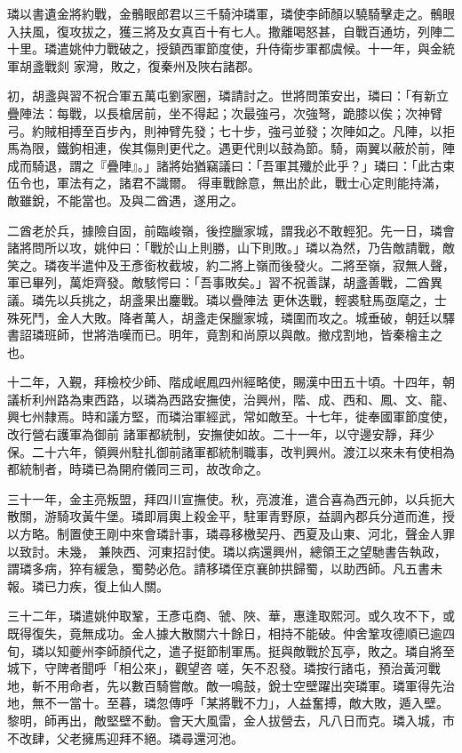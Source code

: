 \begin{pinyinscope}
 璘以書遺金將約戰，金鶻眼郎君以三千騎沖璘軍，璘使李師顏以驍騎擊走之。鶻眼入扶風，復攻拔之，獲三將及女真百十有七人。撒離喝怒甚，自戰百通坊，列陣二十里。璘遣姚仲力戰破之，授鎮西軍節度使，升侍衛步軍都虞候。十一年，與金統軍胡盞戰剡
 家灣，敗之，復秦州及陜右諸郡。



 初，胡盞與習不祝合軍五萬屯劉家圈，璘請討之。世將問策安出，璘曰：「有新立疊陣法：每戰，以長槍居前，坐不得起；次最強弓，次強弩，跪膝以俟；次神臂弓。約賊相搏至百步內，則神臂先發；七十步，強弓並發；次陣如之。凡陣，以拒馬為限，鐵鉤相連，俟其傷則更代之。遇更代則以鼓為節。騎，兩翼以蔽於前，陣成而騎退，謂之『疊陣』。」諸將始猶竊議曰：「吾軍其殲於此乎？」璘曰：「此古束伍令也，軍法有之，諸君不識爾。
 得車戰餘意，無出於此，戰士心定則能持滿，敵雖銳，不能當也。及與二酋遇，遂用之。



 二酋老於兵，據險自固，前臨峻嶺，後控臘家城，謂我必不敢輕犯。先一日，璘會諸將問所以攻，姚仲曰：「戰於山上則勝，山下則敗。」璘以為然，乃告敵請戰，敵笑之。璘夜半遣仲及王彥銜枚截坡，約二將上嶺而後發火。二將至嶺，寂無人聲，軍已畢列，萬炬齊發。敵駭愕曰：「吾事敗矣。」習不祝善謀，胡盞善戰，二酋異議。璘先以兵挑之，胡盞果出鏖戰。璘以疊陣法
 更休迭戰，輕裘駐馬亟麾之，士殊死鬥，金人大敗。降者萬人，胡盞走保臘家城，璘圍而攻之。城垂破，朝廷以驛書詔璘班師，世將浩嘆而已。明年，竟割和尚原以與敵。撤戍割地，皆秦檜主之也。



 十二年，入覲，拜檢校少師、階成岷鳳四州經略使，賜漢中田五十頃。十四年，朝議析利州路為東西路，以璘為西路安撫使，治興州，階、成、西和、鳳、文、龍、興七州隸焉。時和議方堅，而璘治軍經武，常如敵至。十七年，徙奉國軍節度使，改行營右護軍為御前
 諸軍都統制，安撫使如故。二十一年，以守邊安靜，拜少保。二十六年，領興州駐扎御前諸軍都統制職事，改判興州。渡江以來未有使相為都統制者，時璘已為開府儀同三司，故改命之。



 三十一年，金主亮叛盟，拜四川宣撫使。秋，亮渡淮，遣合喜為西元帥，以兵扼大散關，游騎攻黃牛堡。璘即肩輿上殺金平，駐軍青野原，益調內郡兵分道而進，授以方略。制置使王剛中來會璘計事，璘尋移檄契丹、西夏及山東、河北，聲金人罪以致討。未幾，
 兼陜西、河東招討使。璘以病還興州，總領王之望馳書告執政，謂璘多病，猝有緩急，蜀勢必危。請移璘侄京襄帥拱歸蜀，以助西師。凡五書未報。璘已力疾，復上仙人關。



 三十二年，璘遣姚仲取鞏，王彥屯商、虢、陜、華，惠逢取熙河。或久攻不下，或既得復失，竟無成功。金人據大散關六十餘日，相持不能破。仲舍鞏攻德順已逾四旬，璘以知夔州李師顏代之，遣子挺節制軍馬。挺與敵戰於瓦亭，敗之。璘自將至城下，守陴者聞呼「相公來」，觀望咨
 嗟，矢不忍發。璘按行諸屯，預治黃河戰地，斬不用命者，先以數百騎嘗敵。敵一鳴鼓，銳士空壁躍出突璘軍。璘軍得先治地，無不一當十。至暮，璘忽傳呼「某將戰不力」，人益奮搏，敵大敗，遁入壁。黎明，師再出，敵堅壁不動。會天大風雷，金人拔營去，凡八日而克。璘入城，市不改肆，父老擁馬迎拜不絕。璘尋還河池。




\end{pinyinscope}
